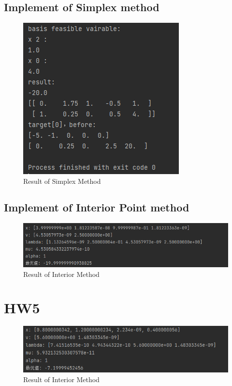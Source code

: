 \documentclass{xjtureport}
\begin{document}
\subsection{Implement of Simplex method}


\begin{figure}[H]
\centering
\includegraphics[scale = 0.6]{Simplex Method Result.png}
\caption{Result of Simplex Method}
\end{figure}


\subsection{Implement of Interior Point method}

\begin{figure}[H]
    \centering
    \includegraphics[scale = 0.6]{Interior Point Method.png}
    \caption{Result of Interior Method}
    \end{figure}
\section{HW5}

\begin{figure}[H]
    \centering
    \includegraphics[scale = 0.6]{Interior Point Method2.png}
    \caption{Result of Interior Method}
    \end{figure}
\end{document}
